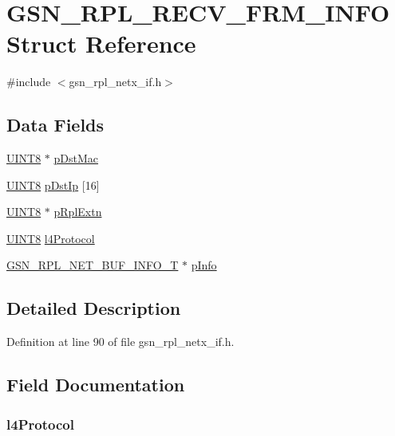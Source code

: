 \hypertarget{a00208}{
\section{GSN\_\-RPL\_\-RECV\_\-FRM\_\-INFO Struct Reference}
\label{a00208}
}


{\ttfamily \#include $<$gsn\_\-rpl\_\-netx\_\-if.h$>$}

\subsection*{Data Fields}
\begin{DoxyCompactItemize}
\item 
\hyperlink{a00660_gab27e9918b538ce9d8ca692479b375b6a}{UINT8} $\ast$ \hyperlink{a00208_a22af0702ae13ea47e1e69feafa02e7cb}{pDstMac}
\item 
\hyperlink{a00660_gab27e9918b538ce9d8ca692479b375b6a}{UINT8} \hyperlink{a00208_a99207703054651b2afadc4dc775510de}{pDstIp} \mbox{[}16\mbox{]}
\item 
\hyperlink{a00660_gab27e9918b538ce9d8ca692479b375b6a}{UINT8} $\ast$ \hyperlink{a00208_aef128c775a69f4460fbba077538011f8}{pRplExtn}
\item 
\hyperlink{a00660_gab27e9918b538ce9d8ca692479b375b6a}{UINT8} \hyperlink{a00208_a443980e432355afdf3da81556fc820d7}{l4Protocol}
\item 
\hyperlink{a00207}{GSN\_\-RPL\_\-NET\_\-BUF\_\-INFO\_\-T} $\ast$ \hyperlink{a00208_a24c66f5468b12f00f3e7857a6845fcb8}{pInfo}
\end{DoxyCompactItemize}


\subsection{Detailed Description}


Definition at line 90 of file gsn\_\-rpl\_\-netx\_\-if.h.



\subsection{Field Documentation}
\hypertarget{a00208_a443980e432355afdf3da81556fc820d7}{
\subsubsection[{l4Protocol}]{ {\bf l4Protocol}}}
\label{a00208_a443980e432355afdf3da81556fc820d7}


